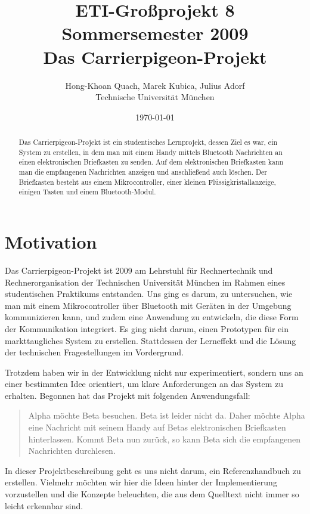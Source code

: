 \documentclass[ngerman]{article}
\author{Hong-Khoan Quach, Marek Kubica, Julius Adorf \\ Technische Universität München}
\title{ETI-Großprojekt 8\\
       Sommersemester 2009 \\
       {\bf Das Carrierpigeon-Projekt}
}
\date{\today}
\begin{document}
\maketitle

\begin{abstract}
Das Carrierpigeon-Projekt ist ein studentisches Lernprojekt, dessen Ziel es war,
ein System zu erstellen, in dem man mit einem Handy mittels Bluetooth
Nachrichten an einen elektronischen Briefkasten zu senden. Auf dem
elektronischen Briefkasten kann man die empfangenen Nachrichten anzeigen
und anschließend auch löschen. Der Briefkasten besteht aus einem Mikrocontroller,
einer kleinen Flüssig\-kristall\-an\-zeige, einigen Tasten und einem
Bluetooth-Modul.
\end{abstract}


\section{Motivation}

Das Carrierpigeon-Projekt ist 2009 am Lehrstuhl für Rechnertechnik und Rechnerorganisation der Technischen
Universität München im Rahmen eines studentischen Praktikums entstanden. Uns ging es darum,
zu untersuchen, wie man mit einem Mikrocontroller über Bluetooth mit Geräten in der Umgebung
kommunizieren kann, und zudem eine Anwendung zu entwickeln, die diese Form der Kommunikation
integriert. Es ging nicht darum, einen Prototypen für ein markttaugliches System zu erstellen.
Stattdessen der Lerneffekt und die Lösung der technischen Fragestellungen im Vordergrund.

Trotzdem haben wir in der Entwicklung nicht nur experimentiert, sondern uns an einer bestimmten
Idee orientiert, um klare Anforderungen an das System zu erhalten. Begonnen hat das Projekt mit
folgenden Anwendungsfall:
\begin{quote}

Alpha möchte Beta besuchen. Beta ist leider nicht da. Daher möchte Alpha eine Nachricht
mit seinem Handy auf Betas elektronischen Briefkasten hinterlassen. Kommt Beta nun zurück,
so kann Beta sich die empfangenen Nachrichten durchlesen.
\end{quote}

In dieser Projektbeschreibung geht es uns nicht darum, ein Referenzhandbuch zu erstellen.
Vielmehr möchten wir hier die Ideen hinter der Implementierung vorzustellen und die Konzepte
beleuchten, die aus dem Quelltext nicht immer so leicht erkennbar sind.


\end{document}

